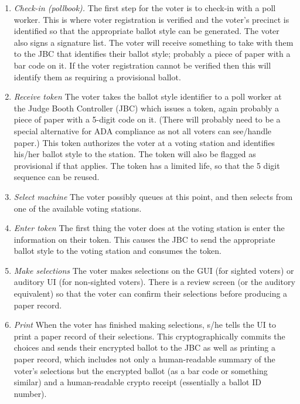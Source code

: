 \begin{enumerate}
\item {\em Check-in (pollbook).}
The first step for the voter is to check-in with a poll worker. This is where voter registration is verified and the voter's precinct is identified so that the appropriate ballot style can be generated. The voter also signs a signature list. The voter will receive something to take with them to the JBC that identifies their ballot style; probably a piece of paper with a bar code on it. If the voter registration cannot be verified then this will identify them as requiring a provisional ballot.

\item {\em Receive token}
The voter takes the ballot style identifier to a poll worker at the Judge Booth Controller (JBC) which issues a token, again probably a piece of paper with a 5-digit code on it. (There will probably need to be a special alternative for ADA compliance as not all voters can see/handle paper.) This token authorizes the voter at a voting station and identifies his/her ballot style to the station. The token will also be flagged as provisional if that applies. The token has a limited life, so that the 5 digit sequence can be reused.

\item {\em Select machine}
The voter possibly queues at this point, and then selects from one of the available voting stations.

\item  {\em Enter token}
The first thing the voter does at the voting station is enter the information on their token. This causes the JBC to send the appropriate ballot style to the voting station and consumes the token.

\item {\em Make selections}
The voter makes selections on the GUI (for sighted voters) or auditory UI (for non-sighted voters). There is a review screen (or the auditory equivalent) so that the voter can confirm their selections before producing a paper record.

\item {\em Print} When the voter has finished making selections, s/he
  tells the UI to print a paper record of their selections. This
  cryptographically commits the choices and sends their encrypted
  ballot to the JBC as well as printing a paper record, which includes
  not only a human-readable summary of the voter's selections but the
  encrypted ballot (as a bar code or something similar)  and a human-readable
  crypto receipt (essentially a ballot ID number).


\end{enumerate}
